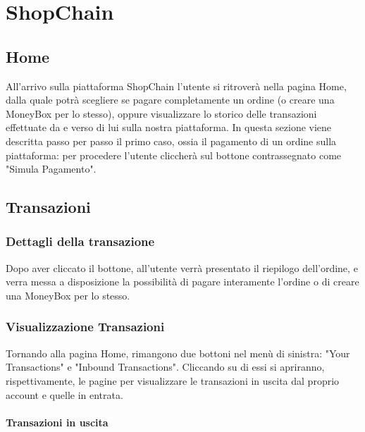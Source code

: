 \section{ShopChain}
    \subsection{Home}
    All'arrivo sulla piattaforma ShopChain l'utente si ritroverà nella pagina Home,
    dalla quale potrà scegliere se pagare completamente un ordine (o creare una MoneyBox per lo stesso),
    oppure visualizzare lo storico delle transazioni effettuate da e verso di lui sulla nostra piattaforma.
    In questa sezione viene descritta passo per passo il primo caso, ossia il pagamento di un ordine sulla piattaforma: 
    per procedere l'utente cliccherà sul bottone contrassegnato come "Simula Pagamento".


    \subsection{Transazioni}


        \subsubsection{Dettagli della transazione}

        Dopo aver cliccato il bottone, all'utente verrà presentato il riepilogo dell'ordine, e verra messa a disposizione la possibilità
        di pagare interamente l'ordine o di creare una MoneyBox per lo stesso.


        \subsubsection{Visualizzazione Transazioni}

        Tornando alla pagina Home, rimangono due bottoni nel menù di sinistra: "Your Transactions" e "Inbound Transactions".
        Cliccando su di essi si apriranno, rispettivamente, le pagine per visualizzare le transazioni in uscita dal proprio account e quelle in entrata.


            \paragraph{Transazioni in uscita}

